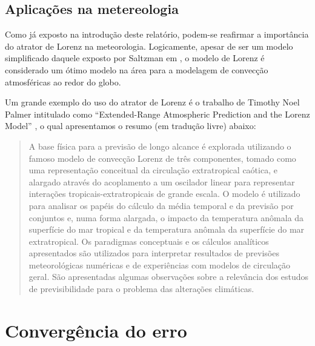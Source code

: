\documentclass[12pt, a4paper]{article}
\begin{document}
    \subsection{Aplicações na metereologia}
    Como já exposto na introdução deste relatório, podem-se reafirmar a
    importância do atrator de Lorenz na meteorologia. Logicamente, apesar de ser um
    modelo simplificado daquele exposto por Saltzman em \cite{Saltzman1962}, o
    modelo de Lorenz é considerado um ótimo modelo na área para a modelagem de
    convecção atmosféricas ao redor do globo.
    
    Um grande exemplo do uso do atrator de Lorenz é o trabalho de Timothy Noel
    Palmer intitulado como ``Extended-Range Atmospheric Prediction and the Lorenz
    Model'' \cite{Palmer1993}, o qual apresentamos o resumo (em tradução livre)
    abaixo:
    \begin{quote}
        \fontsize{10}{12}\selectfont
        A base física para a previsão de longo alcance é explorada utilizando o
        famoso modelo de convecção Lorenz de três componentes, tomado como uma
        representação conceitual da circulação extratropical caótica, e alargado
        através do acoplamento a um oscilador linear para representar interações
        tropicais-extratropicais de grande escala. O modelo é utilizado para
        analisar
        os papéis do cálculo da média temporal e da previsão por conjuntos e, numa
        forma alargada, o impacto da temperatura anômala da superfície do mar
        tropical
        e da temperatura anômala da superfície do mar extratropical. Os paradigmas
        conceptuais e os cálculos analíticos apresentados são utilizados para
        interpretar resultados de previsões meteorológicas numéricas e de
        experiências
        com modelos de circulação geral. São apresentadas algumas observações sobre
        a
        relevância dos estudos de previsibilidade para o problema das alterações
        climáticas.
    \end{quote}
    
    
    \newpage
    
    
    \section{Convergência do erro}
    
\end{document}
